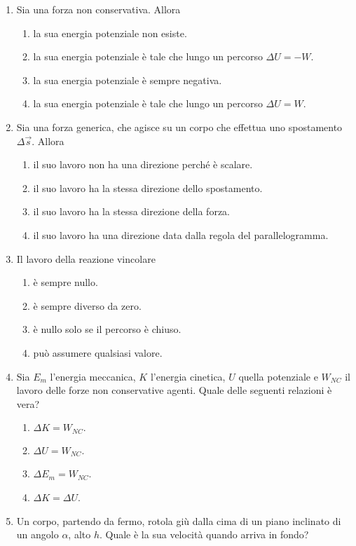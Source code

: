 \documentclass{article}
\begin{document}
\begin{enumerate}
  \item Sia  una forza non conservativa. Allora
  \begin{enumerate}[label=\Alph*.]
    \item la sua energia potenziale non esiste.
    \item la sua energia potenziale è tale che lungo un percorso $\Delta U=-W$.
    \item la sua energia potenziale è sempre negativa.
    \item la sua energia potenziale è tale che lungo un percorso $\Delta U=W$.
  \end{enumerate}
  \item Sia  una forza generica, che agisce su un corpo che effettua uno spostamento $\Delta \vec{s}$. Allora
  \begin{enumerate}[label=\Alph*.]
    \item il suo lavoro non ha una direzione perché è scalare.
    \item il suo lavoro ha la stessa direzione dello spostamento.
    \item il suo lavoro ha la stessa direzione della forza.
    \item il suo lavoro ha una direzione data dalla regola del parallelogramma.
  \end{enumerate}
  \item Il lavoro della reazione vincolare
  \begin{enumerate}[label=\Alph*.]
    \item è sempre nullo.
    \item è sempre diverso da zero.
    \item è nullo solo se il percorso è chiuso.
    \item può assumere qualsiasi valore.
  \end{enumerate}
  \item Sia $E_m$ l'energia meccanica, $K$ l'energia cinetica, $U$ quella potenziale e $W_{NC}$ il lavoro delle forze non conservative agenti. Quale delle seguenti relazioni è vera?
  \begin{enumerate}[label=\Alph*.]
    \item $\Delta K=W_{NC}.$
    \item $\Delta U=W_{NC}$.
    \item $\Delta E_m=W_{NC}$.
    \item $\Delta K = \Delta U$.
  \end{enumerate}
  \item Un corpo, partendo da fermo, rotola giù dalla cima di un piano inclinato di un angolo $\alpha$, alto $h$. Quale è la sua velocità quando arriva in fondo?

\end{enumerate}
\end{document}
